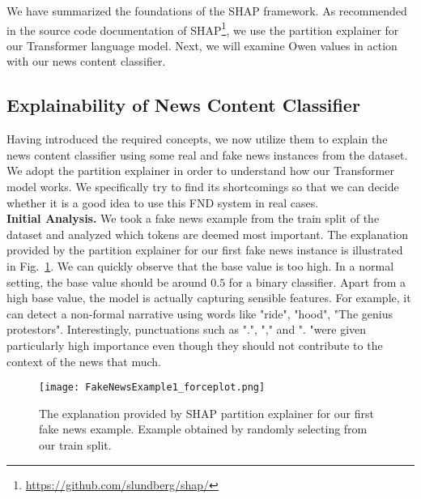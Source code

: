 We have summarized the foundations of the SHAP framework. As recommended in the source code documentation of SHAP\footnote{\url{https://github.com/slundberg/shap/}}, we use the partition explainer for our Transformer language model. Next, we will examine Owen values in action with our news content classifier.

\subsection{Explainability of News Content Classifier}
\label{subsec:ExplainingNewsContentModels_ExplainingNewsContentClassifier}
Having introduced the required concepts, we now utilize them to explain the news content classifier using some real and fake news instances from the dataset. We adopt the partition explainer in order to understand how our Transformer model works. We specifically try to find its shortcomings so that we can decide whether it is a good idea to use this FND system in real cases.\\
\textbf{Initial Analysis.} We took a fake news example from the train split of the dataset and analyzed which tokens are deemed most important. The explanation provided by the partition explainer for our first fake news instance is illustrated in Fig.~\ref{fig:FakeNewsExample1_forceplot}. We can quickly observe that the base value is too high. In a normal setting, the base value should be around $0.5$ for a binary classifier. Apart from a high base value, the model is actually capturing sensible features. For example, it can detect a non-formal narrative using words like "ride", "hood", "The genius protestors".  Interestingly, punctuations such as ".", "," and ". "were given particularly high importance even though they should not contribute to the context of the news that much.\\
\begin{figure}
    \centering
    \texttt{[image: FakeNewsExample1\_forceplot.png]}
    \caption[The explanation provided by SHAP partition explainer for our first fake news example.]{The explanation provided by SHAP partition explainer for our first fake news example. Example obtained by randomly selecting from our train split.}
    \label{fig:FakeNewsExample1_forceplot}
\end{figure}
